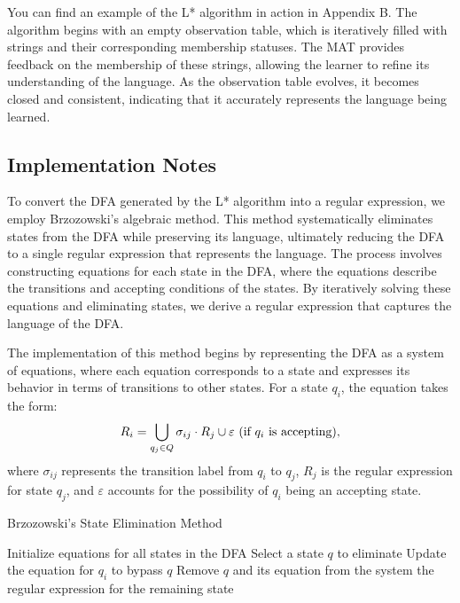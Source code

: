 You can find an example of the L* algorithm in action in Appendix B. The algorithm begins with an empty observation table, which is iteratively filled with strings and their corresponding membership statuses. The MAT provides feedback on the membership of these strings, allowing the learner to refine its understanding of the language. As the observation table evolves, it becomes closed and consistent, indicating that it accurately represents the language being learned.

\subsection{Implementation Notes}

\indent\indent To convert the DFA generated by the L* algorithm into a regular expression, we employ Brzozowski's algebraic method. This method systematically eliminates states from the DFA while preserving its language, ultimately reducing the DFA to a single regular expression that represents the language. The process involves constructing equations for each state in the DFA, where the equations describe the transitions and accepting conditions of the states. By iteratively solving these equations and eliminating states, we derive a regular expression that captures the language of the DFA.

\indent\indent The implementation of this method begins by representing the DFA as a system of equations, where each equation corresponds to a state and expresses its behavior in terms of transitions to other states. For a state \( q_i \), the equation takes the form:
\[
R_i = \bigcup_{q_j \in Q} \sigma_{ij} \cdot R_j \cup \varepsilon \text{ (if \( q_i \) is accepting)},
\]
where \( \sigma_{ij} \) represents the transition label from \( q_i \) to \( q_j \), \( R_j \) is the regular expression for state \( q_j \), and \( \varepsilon \) accounts for the possibility of \( q_i \) being an accepting state.

\begin{algorithm}
    \caption{Brzozowski's State Elimination Method}
    \label{alg:brzozowski}
    \begin{algorithmic}[1]
    \State Initialize equations for all states in the DFA
        \State Select a state \( q \) to eliminate
            \State Update the equation for \( q_i \) to bypass \( q \)
        \EndFor
        \State Remove \( q \) and its equation from the system
    \EndWhile
    \State \Return the regular expression for the remaining state
    \end{algorithmic}
\end{algorithm}


